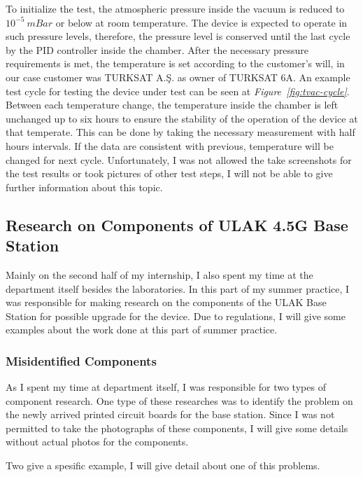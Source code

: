 	 To initialize the test, the atmospheric pressure inside the vacuum is reduced to $10^{-5}~mBar$ or below at room temperature. The device is expected to operate in such pressure levels, therefore, the pressure level is conserved until the last cycle by the PID controller inside the chamber. After the necessary pressure requirements is met, the temperature is set according to the customer's will, in our case customer was TURKSAT A.Ş. as owner of TURKSAT 6A. An example test cycle for testing the device under test can be seen at \textit{Figure~\ref{fig:tvac-cycle}}. Between each temperature change, the temperature inside the chamber is left unchanged up to six hours to ensure the stability of the operation of the device at that temperate. This can be done by taking the necessary measurement with half hours intervals. If the data are consistent with previous, temperature will be changed for next cycle. Unfortunately, I was not allowed the take screenshots for the test results or took pictures of other test steps,  I will not be able to give further information about this topic.
		

\subsection{Research on Components of ULAK 4.5G Base Station  }
\- \indent
	Mainly on the second half of my internship, I also spent my time at the department itself besides the laboratories. In this part of my summer practice, I was responsible for making research on the components of the ULAK Base Station for possible upgrade for the device. Due to regulations, I will give some examples about the work done at this part of summer practice. 


\subsubsection{Misidentified Components}
\- \indent
	As I spent my time at department itself, I was responsible for two types of component research. One type of these researches was to identify the problem on the newly arrived printed circuit boards for the base station. Since I was not permitted to take the photographs of these components, I will give some details without actual photos for the components. 	
	
	Two give a spesific example, I will give detail about one of this problems. 
	
